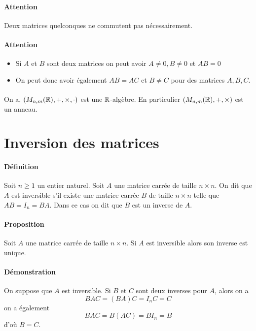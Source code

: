 \paragraph{Attention} Deux matrices quelconques ne commutent pas nécessairement.

\paragraph{Attention}
\begin{itemize}
  \item Si $A$ et $B$ sont deux matrices on peut avoir $A \neq 0, B \neq 0$ et $AB = 0$
  \item On peut donc avoir également $AB = AC$ et $B \neq C$ pour des matrices $A, B, C$.
\end{itemize}

\paragraph{} On a, $(M_{n, m}(\mathbb{R}), +, \times, \cdot)$ est une $\mathbb{R}$-algèbre. En particulier $(M_{n, m}(\mathbb{R}), +, \times)$ est un anneau.

%
%
\section{Inversion des matrices}
%
%

\paragraph{Définition} Soit $n \geq 1$ un entier naturel. Soit $A$ une matrice carrée de taille $n \times n$. On dit que $A$ est inversible s'il existe une matrice carrée $B$ de taille $n \times n$ telle que $A B = I_n = B A$. Dans ce cas on dit que $B$ est un inverse de $A$.

\paragraph{Proposition} Soit $A$ une matrice carrée de taille $n \times n$. Si $A$ est inversible alors son inverse est unique.

\paragraph{Démonstration} On suppose que $A$ est inversible. Si $B$ et $C$ sont deux inverses pour $A$, alors on a
$$B A C = (B A) C = I_n C = C$$
on a également
$$B A C = B (A C) = B I_n = B$$
d'où $B = C$.

